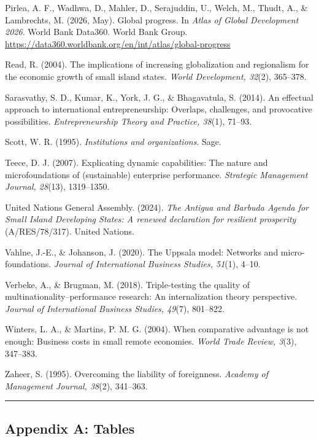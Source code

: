 \documentclass[12pt,a4paper]{article}
\begin{document}
Pirlea, A. F., Wadhwa, D., Mahler, D., Serajuddin, U., Welch, M., Thudt,
A., \& Lambrechts, M. (2026, May). Global progress. In \emph{Atlas of
Global Development 2026}. World Bank Data360. World Bank Group.
\url{https://data360.worldbank.org/en/int/atlas/global-progress}

Read, R. (2004). The implications of increasing globalization and
regionalism for the economic growth of small island states. \emph{World
Development, 32}(2), 365--378.

Sarasvathy, S. D., Kumar, K., York, J. G., \& Bhagavatula, S. (2014). An
effectual approach to international entrepreneurship: Overlaps,
challenges, and provocative possibilities. \emph{Entrepreneurship Theory
and Practice, 38}(1), 71--93.

Scott, W. R. (1995). \emph{Institutions and organizations}. Sage.

Teece, D. J. (2007). Explicating dynamic capabilities: The nature and
microfoundations of (sustainable) enterprise performance.
\emph{Strategic Management Journal, 28}(13), 1319--1350.

United Nations General Assembly. (2024). \emph{The Antigua and Barbuda
Agenda for Small Island Developing States: A renewed declaration for
resilient prosperity} (A/RES/78/317). United Nations.

Vahlne, J.-E., \& Johanson, J. (2020). The Uppsala model: Networks and
micro-foundations. \emph{Journal of International Business Studies,
51}(1), 4--10.

Verbeke, A., \& Brugman, M. (2018). Triple-testing the quality of
multinationality--performance research: An internalization theory
perspective. \emph{Journal of International Business Studies, 49}(7),
801--822.

Winters, L. A., \& Martins, P. M. G. (2004). When comparative advantage
is not enough: Business costs in small remote economies. \emph{World
Trade Review, 3}(3), 347--383.

Zaheer, S. (1995). Overcoming the liability of foreignness.
\emph{Academy of Management Journal, 38}(2), 341--363.

\begin{center}\rule{0.5\linewidth}{0.5pt}\end{center}

\hypertarget{appendix-a-tables}{%
\subsection{Appendix A: Tables}\label{appendix-a-tables}}
\end{document}
